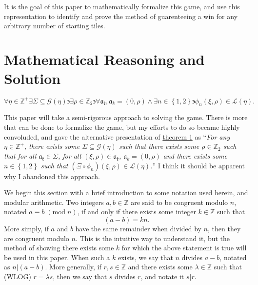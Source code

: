 \documentclass[11pt, letterpaper]{article}
\renewcommand{\mod}[1]{\;(\text{mod}\;#1)}
\begin{document}
It is the goal of this paper to mathematically formalize this game, and use this representation to identify and prove the method of guarenteeing a win for any arbitrary number of starting tiles.
\section{Mathematical Reasoning and Solution}
\label{sec:2}

\begin{theorem}\label{thm:}
	\[
		\forall \eta \in\mathbb{Z}^+\exists \Sigma \subseteq \mathscr{G} (\eta )\backepsilon \exists \rho \in \mathbb{Z}_2 \backepsilon \forall \mathfrak{a} _\mathfrak{k} ,\mathfrak{a} _k = (0,\rho )\land \exists n\in\left\{ 1,2 \right\} \backepsilon\phi _n(\xi ,\rho )\in\mathscr{L} (\eta )
	.\]
	
\end{theorem}

This paper will take a semi-rigorous approach to solving the game. There is more that can be done to formalize the game, but my efforts to do so became highly convoluded, and gave the alternative presentation of \hyperref[lma:1]{theorem 1} as ``\emph{For any $\eta \in\mathbb{Z}^+$, there exists some $\Sigma \subseteq \mathscr{G} (\eta )$ such that there exists some $\rho \in\mathbb{Z}_2$ such that for all $\mathfrak{a} _\mathfrak{k} \in\Sigma $, for all $(\xi ,\rho )\in \mathfrak{a} _\mathfrak{k} $, $\mathfrak{a} _k=(0,\rho ) $ and there exists some $n\in\left\{ 1,2 \right\} $ such that $\left( \Xi \circ \phi _n \right) \left( \xi ,\rho  \right) \in \mathscr{L} (\eta )$.}'' I think it should be apparent why I abandoned this approach.

We begin this section with a brief introduction to some notation used herein, and modular arithmetic. Two integers $a,b\in\mathbb{Z}$ are said to be congruent modulo $n$, notated $a\equiv b\mod{n}$, if and only if there exists some integer $k\in\mathbb{Z}$ such that
\[
	(a-b)=kn
.\]
More simply, if $a$ and $b$ have the same remainder when divided by $n$, then they are congruent modulo $n$. This is the intuitive way to understand it, but the method of showing there exists some $k$ for which the above statement is true will be used in this paper. When such a $k$ exists, we say that $n$ divides $a-b$, notated as $n|(a-b)$. More generally, if $r,s\in\mathbb{Z}$ and there exists some $\lambda \in\mathbb{Z}$ such that (WLOG) $r=\lambda s$, then we say that $s$ divides $r$, and notate it $s|r$.
\end{document}
